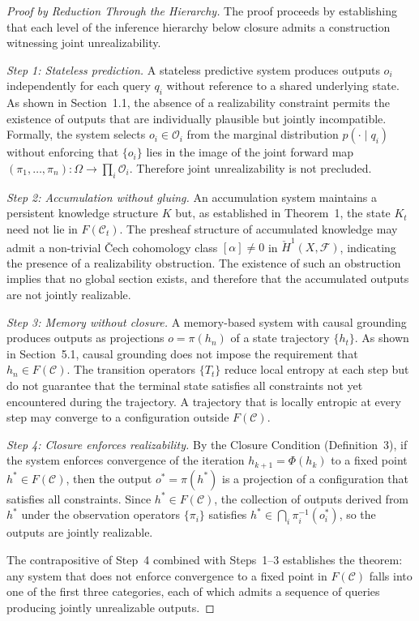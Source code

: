 \documentclass[12pt, oneside]{article}
\begin{document}
\begin{proof}[Proof by Reduction Through the Hierarchy]
The proof proceeds by establishing that each level of the inference hierarchy below closure admits a construction witnessing joint unrealizability.

\textit{Step 1: Stateless prediction.} A stateless predictive system produces outputs $o_i$ independently for each query $q_i$ without reference to a shared underlying state. As shown in Section~1.1, the absence of a realizability constraint permits the existence of outputs that are individually plausible but jointly incompatible. Formally, the system selects $o_i \in \mathcal{O}_i$ from the marginal distribution $p(\cdot \mid q_i)$ without enforcing that $\{o_i\}$ lies in the image of the joint forward map $(\pi_1, \ldots, \pi_n) : \Omega \to \prod_i \mathcal{O}_i$. Therefore joint unrealizability is not precluded.

\textit{Step 2: Accumulation without gluing.} An accumulation system maintains a persistent knowledge structure $K$ but, as established in Theorem~1, the state $K_t$ need not lie in $F(\mathcal{C}_t)$. The presheaf structure of accumulated knowledge may admit a non-trivial \v{C}ech cohomology class $[\alpha] \neq 0$ in $\check{H}^1(X, \mathcal{F})$, indicating the presence of a realizability obstruction. The existence of such an obstruction implies that no global section exists, and therefore that the accumulated outputs are not jointly realizable.

\textit{Step 3: Memory without closure.} A memory-based system with causal grounding produces outputs as projections $o = \pi(h_n)$ of a state trajectory $\{h_t\}$. As shown in Section~5.1, causal grounding does not impose the requirement that $h_n \in F(\mathcal{C})$. The transition operators $\{T_t\}$ reduce local entropy at each step but do not guarantee that the terminal state satisfies all constraints not yet encountered during the trajectory. A trajectory that is locally entropic at every step may converge to a configuration outside $F(\mathcal{C})$.

\textit{Step 4: Closure enforces realizability.} By the Closure Condition (Definition~3), if the system enforces convergence of the iteration $h_{k+1} = \Phi(h_k)$ to a fixed point $h^* \in F(\mathcal{C})$, then the output $o^* = \pi(h^*)$ is a projection of a configuration that satisfies all constraints. Since $h^* \in F(\mathcal{C})$, the collection of outputs derived from $h^*$ under the observation operators $\{\pi_i\}$ satisfies $h^* \in \bigcap_i \pi_i^{-1}(o_i^*)$, so the outputs are jointly realizable.

The contrapositive of Step~4 combined with Steps~1--3 establishes the theorem: any system that does not enforce convergence to a fixed point in $F(\mathcal{C})$ falls into one of the first three categories, each of which admits a sequence of queries producing jointly unrealizable outputs.
\end{proof}
\end{document}
